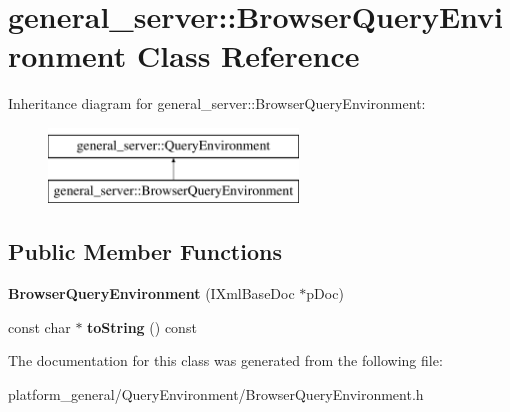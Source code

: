 \hypertarget{classgeneral__server_1_1BrowserQueryEnvironment}{\section{general\-\_\-server\-:\-:\-Browser\-Query\-Environment \-Class \-Reference}
\label{classgeneral__server_1_1BrowserQueryEnvironment}
}
\-Inheritance diagram for general\-\_\-server\-:\-:\-Browser\-Query\-Environment\-:\begin{figure}[H]
\begin{center}
\leavevmode
\includegraphics[height=2.000000cm]{classgeneral__server_1_1BrowserQueryEnvironment}
\end{center}
\end{figure}
\subsection*{\-Public \-Member \-Functions}
\begin{DoxyCompactItemize}
\item 
\hypertarget{classgeneral__server_1_1BrowserQueryEnvironment_a0c7a3876117fa5bc9fc4a8fc1711ae8e}{{\bfseries \-Browser\-Query\-Environment} (\-I\-Xml\-Base\-Doc $\ast$p\-Doc)}\label{classgeneral__server_1_1BrowserQueryEnvironment_a0c7a3876117fa5bc9fc4a8fc1711ae8e}

\item 
\hypertarget{classgeneral__server_1_1BrowserQueryEnvironment_adb954d754aaedb1dad94fed93fd20b5e}{const char $\ast$ {\bfseries to\-String} () const }\label{classgeneral__server_1_1BrowserQueryEnvironment_adb954d754aaedb1dad94fed93fd20b5e}

\end{DoxyCompactItemize}


\-The documentation for this class was generated from the following file\-:\begin{DoxyCompactItemize}
\item 
platform\-\_\-general/\-Query\-Environment/\-Browser\-Query\-Environment.\-h\end{DoxyCompactItemize}
